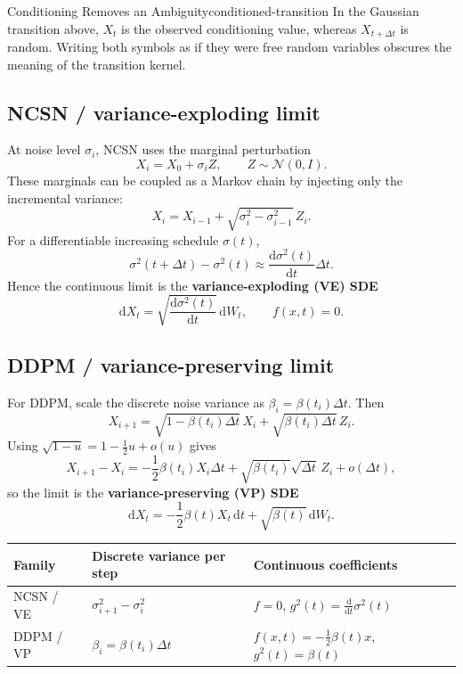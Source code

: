 \documentclass[11pt,a4paper]{article}
\renewcommand{\d}{\mathrm{d}}
\newcommand{\cN}{\mathcal{N}}
\begin{document}
\begin{remark}{Conditioning Removes an Ambiguity}{conditioned-transition}
In the Gaussian transition above, $X_t$ is the observed conditioning value,
whereas $X_{t+\Delta t}$ is random.  Writing both symbols as if they were free
random variables obscures the meaning of the transition kernel.
\end{remark}

\subsection{NCSN / variance-exploding limit}

At noise level $\sigma_i$, NCSN uses the marginal perturbation
\[
  X_i=X_0+\sigma_i Z,
  \qquad Z\sim\cN(0,I).
\]
These marginals can be coupled as a Markov chain by injecting only the
incremental variance:
\[
  X_i=X_{i-1}
      +\sqrt{\sigma_i^2-\sigma_{i-1}^2}\,Z_i.
\]
For a differentiable increasing schedule $\sigma(t)$,
\[
  \sigma^2(t+\Delta t)-\sigma^2(t)
  \approx \frac{\d\sigma^2(t)}{\d t}\Delta t.
\]
Hence the continuous limit is the \textbf{variance-exploding (VE) SDE}
\begin{equation}\label{eq:ve-sde}
  \d X_t=\sqrt{\frac{\d\sigma^2(t)}{\d t}}\,\d W_t,
  \qquad f(x,t)=0.
\end{equation}

\subsection{DDPM / variance-preserving limit}

For DDPM, scale the discrete noise variance as
$\beta_i=\beta(t_i)\Delta t$.  Then
\[
  X_{i+1}
  =\sqrt{1-\beta(t_i)\Delta t}\,X_i
   +\sqrt{\beta(t_i)\Delta t}\,Z_i.
\]
Using $\sqrt{1-u}=1-\tfrac12u+o(u)$ gives
\[
  X_{i+1}-X_i
  =-\frac12\beta(t_i)X_i\Delta t
   +\sqrt{\beta(t_i)}\sqrt{\Delta t}\,Z_i+o(\Delta t),
\]
so the limit is the \textbf{variance-preserving (VP) SDE}
\begin{equation}\label{eq:vp-sde}
  \d X_t=-\frac12\beta(t)X_t\,\d t
          +\sqrt{\beta(t)}\,\d W_t.
\end{equation}

\begin{tcolorbox}[
  colback=softgray,colframe=mydarkblue!20,arc=2pt,boxrule=0.5pt,
  title={\bfseries Discrete-to-continuous dictionary},fonttitle=\small
]
\centering
\begin{tabularx}{\linewidth}{@{}lXX@{}}
\toprule
Family & Discrete variance per step & Continuous coefficients \\
\midrule
NCSN / VE
& $\sigma_{i+1}^2-\sigma_i^2$
& $f=0$, $g^2(t)=\frac{\d}{\d t}\sigma^2(t)$ \\
DDPM / VP
& $\beta_i=\beta(t_i)\Delta t$
& $f(x,t)=-\frac12\beta(t)x$, $g^2(t)=\beta(t)$ \\
\bottomrule
\end{tabularx}
\end{tcolorbox}
\end{document}
